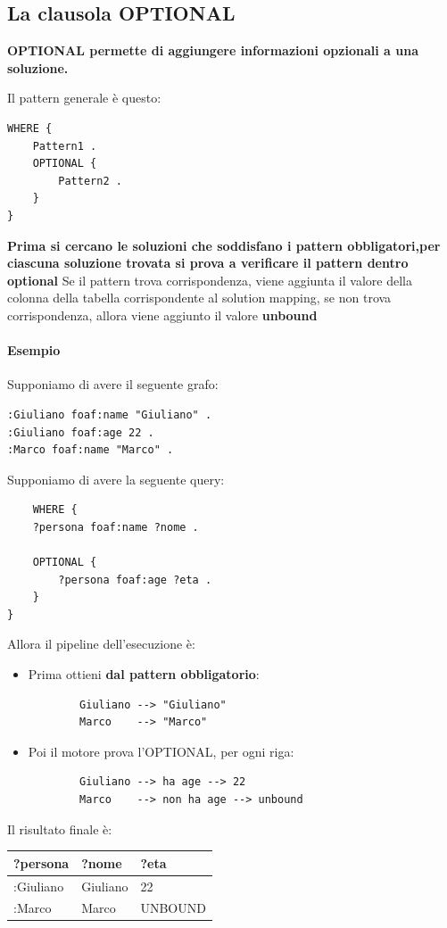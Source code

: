 \subsection{La clausola OPTIONAL}
\textbf{OPTIONAL permette di aggiungere informazioni opzionali a una soluzione.}


Il pattern generale è questo:
\begin{lstlisting}
WHERE {
    Pattern1 .
    OPTIONAL {
        Pattern2 .
    }
}
\end{lstlisting}
\textbf{Prima si cercano le soluzioni che soddisfano i pattern obbligatori,per ciascuna soluzione trovata si prova a verificare il pattern dentro optional}
Se il pattern trova corrispondenza, viene aggiunta il valore della colonna della tabella corrispondente al solution mapping, se non trova corrispondenza, allora 
viene aggiunto il valore \textbf{unbound}


\paragraph{Esempio}
Supponiamo di avere il seguente grafo:
\begin{lstlisting}
:Giuliano foaf:name "Giuliano" .
:Giuliano foaf:age 22 .
:Marco foaf:name "Marco" .
\end{lstlisting}

Supponiamo di avere la seguente query:
\begin{lstlisting}
    WHERE {
    ?persona foaf:name ?nome .

    OPTIONAL {
        ?persona foaf:age ?eta .
    }
}
\end{lstlisting}
Allora il pipeline dell'esecuzione è:
\begin{itemize}
    \item Prima ottieni \textbf{dal pattern obbligatorio}:
    \begin{lstlisting}
        Giuliano --> "Giuliano"
        Marco    --> "Marco"
    \end{lstlisting}
    \item Poi il motore prova l'OPTIONAL, per ogni riga:
    \begin{lstlisting}
        Giuliano --> ha age --> 22
        Marco    --> non ha age --> unbound
    \end{lstlisting}
\end{itemize}
Il risultato finale è:
\begin{table}[h]
\centering
\begin{tabular}{|l|l||l|}
\hline
\textbf{?persona} & \textbf{?nome} & \textbf{?eta} \\ \hline
:Giuliano          & Giuliano & 22      \\ \hline
:Marco             & Marco    & UNBOUND \\ \hline
\end{tabular}
\end{table}


